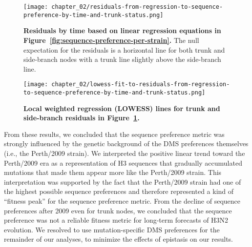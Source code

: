 \begin{figure}
  \centering
  \texttt{[image: chapter\_02/residuals-from-regression-to-sequence-preference-by-time-and-trunk-status.png]}
  \caption[{Residuals by time based on linear regression equations in Figure~\ref{fig:sequence-preference-per-strain}.}]{\label{fig:residuals-from-regression-fit-to-sequence-preference-per-strain} {\bf Residuals by time based on linear regression equations in Figure~\ref{fig:sequence-preference-per-strain}.}
    The null expectation for the residuals is a horizontal line for both trunk and side-branch nodes with a trunk line slightly above the side-branch line.}
\end{figure}

\begin{figure}
  \centering
  \texttt{[image: chapter\_02/lowess-fit-to-residuals-from-regression-to-sequence-preference-by-time-and-trunk-status.png]}
  \caption[{Local weighted regression (LOWESS) lines for trunk and side-branch residuals in Figure~\ref{fig:residuals-from-regression-fit-to-sequence-preference-per-strain}.}]{\label{fig:lowess-residuals-from-regression-fit-to-sequence-preference-per-strain} {\bf Local weighted regression (LOWESS) lines for trunk and side-branch residuals in Figure~\ref{fig:residuals-from-regression-fit-to-sequence-preference-per-strain}.}}
\end{figure}

From these results, we concluded that the sequence preference metric was strongly influenced by the genetic background of the DMS preferences themselves (i.e., the Perth/2009 strain).
We interpreted the positive linear trend toward the Perth/2009 era as a representation of H3 sequences that gradually accumulated mutations that made them appear more like the Perth/2009 strain.
This interpretation was supported by the fact that the Perth/2009 strain had one of the highest possible sequence preferences and therefore represented a kind of ``fitness peak'' for the sequence preference metric.
From the decline of sequence preferences after 2009 even for trunk nodes, we concluded that the sequence preference was not a reliable fitness metric for long-term forecasts of H3N2 evolution.
We resolved to use mutation-specific DMS preferences for the remainder of our analyses, to minimize the effects of epistasis on our results.
